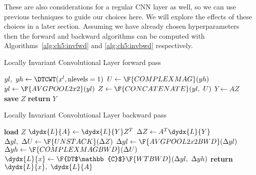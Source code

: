 These are also considerations for a regular CNN layer as well, so we can use
previous techniques to guide our choices here. We will explore the effects of
these choices in a later section. Assuming we have already chosen
hyperparameters then the forward and backward algorithms can be computed with
Algorithms~\autoref{alg:ch5:invfwd} and \autoref{alg:ch5:invbwd} respectively.

\begin{algorithm}[t]
\caption{Locally Invariant Convolutional Layer forward
pass}\label{alg:ch5:invfwd}
\begin{algorithmic}[1]
  \State $yl,\ yh \gets \DTCWT(x^l, \mbox{nlevels}=1) $ 
  \State $U \gets \F{COMPLEXMAG}(yh)$
  \State $yl \gets \F{AVGPOOL2x2}(yl)$  
  \State $Z \gets \F{CONCATENATE}(yl,\ U)$ 
  \State $Y \gets AZ$ 
  \State \textbf{save} $Z$ 
  \State \textbf{return} $Y$ 
\EndProcedure
\end{algorithmic}
\end{algorithm}

\begin{algorithm}[t]
\caption{Locally Invariant Convolutional Layer backward
pass}\label{alg:ch5:invbwd}
\begin{algorithmic}[1]
  \State \textbf{load} $Z$
  \State $\dydx{L}{A} \gets \dydx{L}{Y} Z^T$
  \State $\Delta{Z} \gets A^T\dydx{L}{Y}$
  \State $\Delta yl,\ \Delta U \gets \F{UNSTACK}(\Delta Z)$ 
  \State $\Delta yl \gets \F{AVGPOOL2x2BWD}(\Delta yl)$
  \State $\Delta yh \gets \F{COMPLEXMAGBWD}(\Delta U)$
  \State $\dydx{L}{x} \gets \F{DT$\mathbb{C}$}\F{WTBWD}(\Delta yl,\ \Delta yh)$
  \State \textbf{return} $\dydx{L}{x},\ \dydx{L}{A}$
\EndProcedure
\end{algorithmic}
\end{algorithm}
